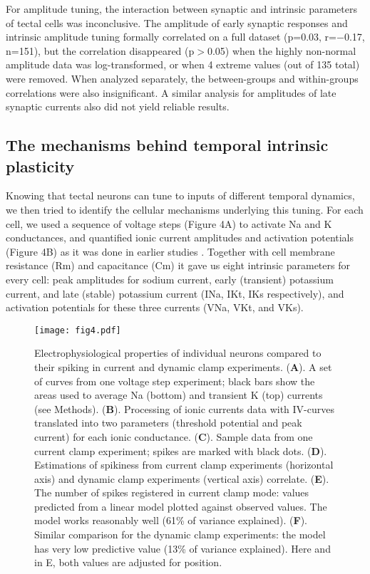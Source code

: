 \documentclass{article}
\begin{document}
For amplitude tuning, the interaction between synaptic and intrinsic parameters of tectal cells was inconclusive. The amplitude of early synaptic responses and intrinsic amplitude tuning formally correlated on a full dataset (p=0.03, r=$-$0.17, n=151), but the correlation disappeared (p$>$0.05) when the highly non-normal amplitude data was log-transformed, or when 4 extreme values (out of 135 total) were removed. When analyzed separately, the between-groups and within-groups correlations were also insignificant. A similar analysis for amplitudes of late synaptic currents also did not yield reliable results.

\subsection*{The mechanisms behind temporal intrinsic plasticity}

Knowing that tectal neurons can tune to inputs of different temporal dynamics, we then tried to identify the cellular mechanisms underlying this tuning. For each cell, we used a sequence of voltage steps (Figure 4A) to activate Na and K conductances, and quantified ionic current amplitudes and activation potentials (Figure 4B) as it was done in earlier studies \citep{ciarleglio2015}. Together with cell membrane resistance (Rm) and capacitance (Cm) it gave us eight intrinsic parameters for every cell: peak amplitudes for sodium current, early (transient) potassium current, and late (stable) potassium current (INa, IKt, IKs respectively), and activation potentials for these three currents (VNa, VKt, and VKs). 

\begin{figure}[!t]
\centering
\texttt{[image: fig4.pdf]}
\caption{Electrophysiological properties of individual neurons compared to their spiking in current and dynamic clamp experiments. (\textbf{A}). A set of curves from one voltage step experiment; black bars show the areas used to average Na (bottom) and transient K (top) currents (see Methods). (\textbf{B}). Processing of ionic currents data with IV-curves translated into two parameters (threshold potential and peak current) for each ionic conductance. (\textbf{C}). Sample data from one current clamp experiment; spikes are marked with black dots. (\textbf{D}). Estimations of spikiness from current clamp experiments (horizontal axis) and dynamic clamp experiments (vertical axis) correlate. (\textbf{E}). The number of spikes registered in current clamp mode: values predicted from a linear model plotted against observed values. The model works reasonably well (61\% of variance explained). (\textbf{F}). Similar comparison for the dynamic clamp experiments: the model has very low predictive value (13\% of variance explained). Here and in E, both values are adjusted for position.}
\end{figure}
\end{document}
